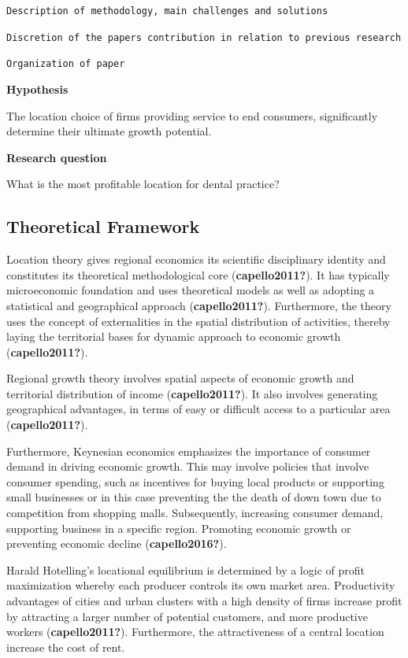 \documentclass[
  10,
  a4paper,
]{article}
\begin{document}
\texttt{Description\ of\ methodology,\ main\ challenges\ and\ solutions}

\texttt{Discretion\ of\ the\ papers\ contribution\ in\ relation\ to\ previous\ research}

\texttt{Organization\ of\ paper}

\textbf{Hypothesis}

The location choice of firms providing service to end consumers,
significantly determine their ultimate growth potential.

\textbf{Research question}

What is the most profitable location for dental practice?

\hypertarget{theoretical-framework}{%
\subsection{Theoretical Framework}\label{theoretical-framework}}

Location theory gives regional economics its scientific disciplinary
identity and constitutes its theoretical methodological core
(\textbf{capello2011?}). It has typically microeconomic foundation and
uses theoretical models as well as adopting a statistical and
geographical approach (\textbf{capello2011?}). Furthermore, the theory
uses the concept of externalities in the spatial distribution of
activities, thereby laying the territorial bases for dynamic approach to
economic growth (\textbf{capello2011?}).

Regional growth theory involves spatial aspects of economic growth and
territorial distribution of income (\textbf{capello2011?}). It also
involves generating geographical advantages, in terms of easy or
difficult access to a particular area (\textbf{capello2011?}).

Furthermore, Keynesian economics emphasizes the importance of consumer
demand in driving economic growth. This may involve policies that
involve consumer spending, such as incentives for buying local products
or supporting small businesses or in this case preventing the the death
of down town due to competition from shopping malls. Subsequently,
increasing consumer demand, supporting business in a specific region.
Promoting economic growth or preventing economic decline
(\textbf{capello2016?}).

Harald Hotelling's locational equilibrium is determined by a logic of
profit maximization whereby each producer controls its own market area.
Productivity advantages of cities and urban clusters with a high density
of firms increase profit by attracting a larger number of potential
customers, and more productive workers (\textbf{capello2011?}).
Furthermore, the attractiveness of a central location increase the cost
of rent.
\end{document}
